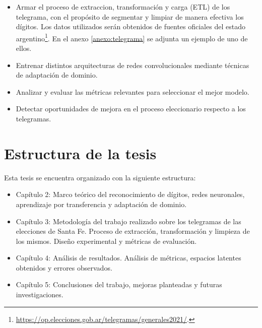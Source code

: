 \begin{itemize}
    \item Armar el proceso de extraccion, transformación y carga (ETL) de los telegrama, con el propósito de segmentar y limpiar
          de manera efectiva los dígitos. Los datos utilizados serán obtenidos de fuentes oficiales del estado
          argentino\footnote{\href{https://op.elecciones.gob.ar/telegramas/generales2021/}{https://op.elecciones.gob.ar/telegramas/generales2021/}.}.
          En el anexo \ref{anexo:telegrama} se adjunta un ejemplo de uno de ellos.
    \item Entrenar distintos arquitecturas de redes convolucionales mediante técnicas de adaptación de dominio.
    \item Analizar y evaluar las métricas relevantes para seleccionar el mejor modelo.
    \item Detectar oportunidades de mejora en el proceso eleccionario respecto a los telegramas.
\end{itemize}

\section{Estructura de la tesis}

Esta tesis se encuentra organizado con la siguiente estructura:

\begin{itemize}
    \item Capítulo 2: Marco teórico del reconocimiento de dígitos, redes neuronales, aprendizaje por transferencia y adaptación
          de dominio.
    \item Capítulo 3: Metodología del trabajo realizado sobre los telegramas de las elecciones de Santa Fe. Proceso de
          extracción, transformación y limpieza de los mismos. Diseño experimental y métricas de evaluación.
    \item Capítulo 4: Análisis de resultados. Análisis de métricas, espacios latentes obtenidos y errores observados.
    \item Capítulo 5: Conclusiones del trabajo, mejoras planteadas y futuras investigaciones.
\end{itemize}